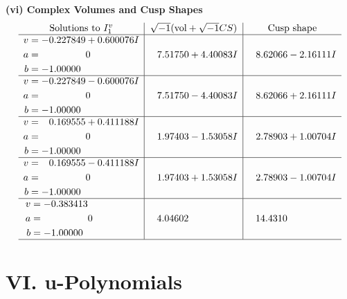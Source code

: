 \documentclass[1p]{elsarticle_modified}
\theoremstyle{definition}
\newcommand{\I}{\sqrt{-1}}
\begin{document}
\newpage\flushleft \textbf{(vi) Complex Volumes and Cusp Shapes}
$$\begin{array}{c|c|c}  
\text{Solutions to }I^v_{1}& \I (\text{vol} + \sqrt{-1}CS) & \text{Cusp shape}\\
 \hline 
\begin{aligned}
v &= -0.227849 + 0.600076 I \\
a &= \phantom{-0.000000 } 0 \\
b &= -1.00000\phantom{ +0.000000I}\end{aligned}
 & \phantom{-}7.51750 + 4.40083 I & \phantom{-}8.62066 - 2.16111 I \\ \hline\begin{aligned}
v &= -0.227849 - 0.600076 I \\
a &= \phantom{-0.000000 } 0 \\
b &= -1.00000\phantom{ +0.000000I}\end{aligned}
 & \phantom{-}7.51750 - 4.40083 I & \phantom{-}8.62066 + 2.16111 I \\ \hline\begin{aligned}
v &= \phantom{-}0.169555 + 0.411188 I \\
a &= \phantom{-0.000000 } 0 \\
b &= -1.00000\phantom{ +0.000000I}\end{aligned}
 & \phantom{-}1.97403 - 1.53058 I & \phantom{-}2.78903 + 1.00704 I \\ \hline\begin{aligned}
v &= \phantom{-}0.169555 - 0.411188 I \\
a &= \phantom{-0.000000 } 0 \\
b &= -1.00000\phantom{ +0.000000I}\end{aligned}
 & \phantom{-}1.97403 + 1.53058 I & \phantom{-}2.78903 - 1.00704 I \\ \hline\begin{aligned}
v &= -0.383413\phantom{ +0.000000I} \\
a &= \phantom{-0.000000 } 0 \\
b &= -1.00000\phantom{ +0.000000I}\end{aligned}
 & \phantom{-}4.04602\phantom{ +0.000000I} & \phantom{-}14.4310\phantom{ +0.000000I}\\
 \hline 
 \end{array}$$\newpage
\newpage\renewcommand{\arraystretch}{1}
\centering \section*{ VI. u-Polynomials}
\end{document}
